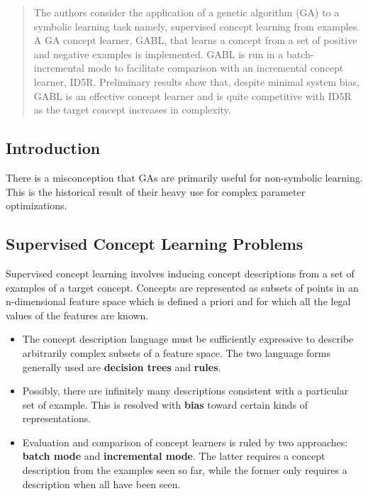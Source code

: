 \documentclass[../main.tex]{subfiles}
\begin{document}
\begin{mdframed}
\end{mdframed}

\begin{abstract}
The authors consider the application of a genetic algorithm (GA) to a symbolic learning task namely, supervised concept
learning from examples. A GA concept learner, GABL, that learns a concept from a set of positive and negative examples
is implemented. GABL is run in a batch-incremental mode to facilitate comparison with an incremental concept learner,
ID5R. Preliminary results show that, despite minimal system bias, GABL is an effective concept learner and is quite
competitive with ID5R as the target concept increases in complexity.
\end{abstract}

\subsection{Introduction}

There is a misconception that GAs are primarily useful for non-symbolic learning. This is the historical result of
their heavy use for complex parameter optimizations.

\subsection{Supervised Concept Learning Problems}
Supervised concept learning involves inducing concept descriptions from a set of examples of a target concept. Concepts
are represented as subsets of points in an n-dimensional feature space which is defined a priori and for which all the
legal values of the features are known.

\begin{itemize}
	\item The concept description language must be sufficiently expressive to describe arbitrarily
	complex subsets of a feature space. The two language forms generally used are \textbf{decision trees} and
	\textbf{rules}.
	\item Possibly, there are infinitely many descriptions consistent with a particular set of example. This is
	resolved with \textbf{bias} toward certain kinds of representations.
	\item Evaluation and comparison of concept learners is ruled by two approaches: \textbf{batch mode} and
	\textbf{incremental mode}. The latter requires a concept description from the examples seen so far, while the
	former only requires a description when all have been seen.
\end{itemize}
\end{document}
